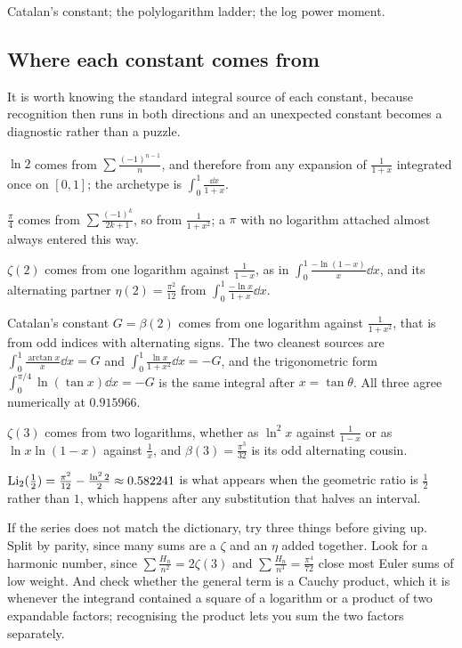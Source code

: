 \begin{seealsob}Catalan's constant; the polylogarithm ladder; the log power moment.\end{seealsob}

\subsection{Where each constant comes from}

It is worth knowing the standard integral source of each constant, because recognition then runs in both directions and an unexpected constant becomes a diagnostic rather than a puzzle.

$\ln2$ comes from $\sum\frac{(-1)^{n-1}}{n}$, and therefore from any expansion of $\frac{1}{1+x}$ integrated once on $[0,1]$; the archetype is $\int_0^1\frac{\dd x}{1+x}$.

$\tfrac{\pi}{4}$ comes from $\sum\frac{(-1)^{k}}{2k+1}$, so from $\frac{1}{1+x^{2}}$; a $\pi$ with no logarithm attached almost always entered this way.

$\zeta(2)$ comes from one logarithm against $\frac{1}{1-x}$, as in $\int_0^1\frac{-\ln(1-x)}{x}\dd x$, and its alternating partner $\eta(2)=\tfrac{\pi^{2}}{12}$ from $\int_0^1\frac{-\ln x}{1+x}\dd x$.

Catalan's constant $G=\beta(2)$ comes from one logarithm against $\frac{1}{1+x^{2}}$, that is from odd indices with alternating signs. The two cleanest sources are $\int_0^1\frac{\arctan x}{x}\dd x=G$ and $\int_0^1\frac{\ln x}{1+x^{2}}\dd x=-G$, and the trigonometric form $\int_0^{\pi/4}\ln(\tan x)\dd x=-G$ is the same integral after $x=\tan\theta$. All three agree numerically at $0.915966$.

$\zeta(3)$ comes from two logarithms, whether as $\ln^{2}x$ against $\frac{1}{1-x}$ or as $\ln x\ln(1-x)$ against $\frac1x$, and $\beta(3)=\tfrac{\pi^{3}}{32}$ is its odd alternating cousin.

$\operatorname{Li}_2(\tfrac12)=\tfrac{\pi^{2}}{12}-\tfrac{\ln^{2}2}{2}\approx0.582241$ is what appears when the geometric ratio is $\tfrac12$ rather than $1$, which happens after any substitution that halves an interval.

\begin{keynote}
If the series does not match the dictionary, try three things before giving up. Split by parity, since many sums are a $\zeta$ and an $\eta$ added together. Look for a harmonic number, since $\sum\frac{H_n}{n^{2}}=2\zeta(3)$ and $\sum\frac{H_n}{n^{3}}=\tfrac{\pi^{4}}{72}$ close most Euler sums of low weight. And check whether the general term is a Cauchy product, which it is whenever the integrand contained a square of a logarithm or a product of two expandable factors; recognising the product lets you sum the two factors separately.
\end{keynote}

